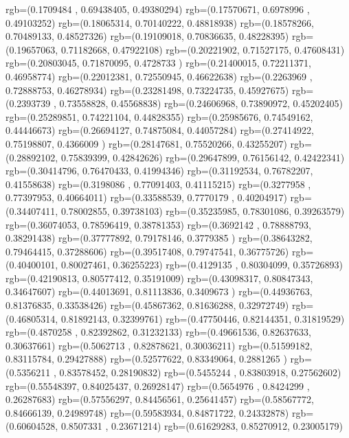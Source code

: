 {{{		  rgb=(0.1709484 ,  0.69438405,  0.49380294)
		  rgb=(0.17570671,  0.6978996 ,  0.49103252)
		  rgb=(0.18065314,  0.70140222,  0.48818938)
		  rgb=(0.18578266,  0.70489133,  0.48527326)
		  rgb=(0.19109018,  0.70836635,  0.48228395)
		  rgb=(0.19657063,  0.71182668,  0.47922108)
		  rgb=(0.20221902,  0.71527175,  0.47608431)
		  rgb=(0.20803045,  0.71870095,  0.4728733 )
		  rgb=(0.21400015,  0.72211371,  0.46958774)
		  rgb=(0.22012381,  0.72550945,  0.46622638)
		  rgb=(0.2263969 ,  0.72888753,  0.46278934)
		  rgb=(0.23281498,  0.73224735,  0.45927675)
		  rgb=(0.2393739 ,  0.73558828,  0.45568838)
		  rgb=(0.24606968,  0.73890972,  0.45202405)
		  rgb=(0.25289851,  0.74221104,  0.44828355)
		  rgb=(0.25985676,  0.74549162,  0.44446673)
		  rgb=(0.26694127,  0.74875084,  0.44057284)
		  rgb=(0.27414922,  0.75198807,  0.4366009 )
		  rgb=(0.28147681,  0.75520266,  0.43255207)
		  rgb=(0.28892102,  0.75839399,  0.42842626)
		  rgb=(0.29647899,  0.76156142,  0.42422341)
		  rgb=(0.30414796,  0.76470433,  0.41994346)
		  rgb=(0.31192534,  0.76782207,  0.41558638)
		  rgb=(0.3198086 ,  0.77091403,  0.41115215)
		  rgb=(0.3277958 ,  0.77397953,  0.40664011)
		  rgb=(0.33588539,  0.7770179 ,  0.40204917)
		  rgb=(0.34407411,  0.78002855,  0.39738103)
		  rgb=(0.35235985,  0.78301086,  0.39263579)
		  rgb=(0.36074053,  0.78596419,  0.38781353)
		  rgb=(0.3692142 ,  0.78888793,  0.38291438)
		  rgb=(0.37777892,  0.79178146,  0.3779385 )
		  rgb=(0.38643282,  0.79464415,  0.37288606)
		  rgb=(0.39517408,  0.79747541,  0.36775726)
		  rgb=(0.40400101,  0.80027461,  0.36255223)
		  rgb=(0.4129135 ,  0.80304099,  0.35726893)
		  rgb=(0.42190813,  0.80577412,  0.35191009)
		  rgb=(0.43098317,  0.80847343,  0.34647607)
		  rgb=(0.44013691,  0.81113836,  0.3409673 )
		  rgb=(0.44936763,  0.81376835,  0.33538426)
		  rgb=(0.45867362,  0.81636288,  0.32972749)
		  rgb=(0.46805314,  0.81892143,  0.32399761)
		  rgb=(0.47750446,  0.82144351,  0.31819529)
		  rgb=(0.4870258 ,  0.82392862,  0.31232133)
		  rgb=(0.49661536,  0.82637633,  0.30637661)
		  rgb=(0.5062713 ,  0.82878621,  0.30036211)
		  rgb=(0.51599182,  0.83115784,  0.29427888)
		  rgb=(0.52577622,  0.83349064,  0.2881265 )
		  rgb=(0.5356211 ,  0.83578452,  0.28190832)
		  rgb=(0.5455244 ,  0.83803918,  0.27562602)
		  rgb=(0.55548397,  0.84025437,  0.26928147)
		  rgb=(0.5654976 ,  0.8424299 ,  0.26287683)
		  rgb=(0.57556297,  0.84456561,  0.25641457)
		  rgb=(0.58567772,  0.84666139,  0.24989748)
		  rgb=(0.59583934,  0.84871722,  0.24332878)
		  rgb=(0.60604528,  0.8507331 ,  0.23671214)
		  rgb=(0.61629283,  0.85270912,  0.23005179)
}}}

